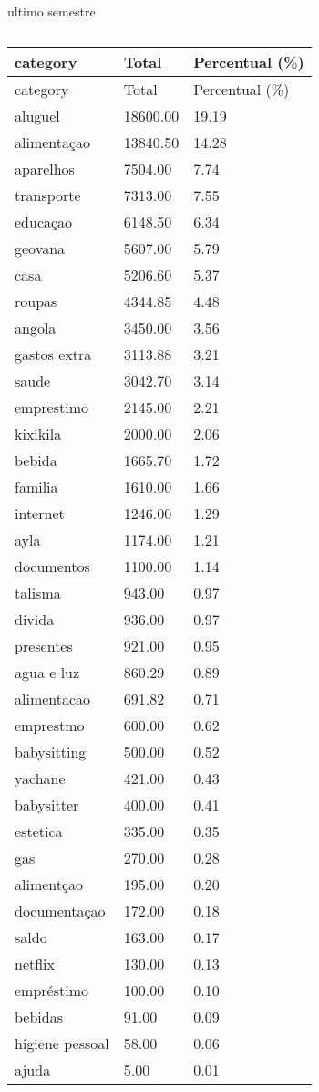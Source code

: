 \documentclass[
  8pt,
  a4paper,
  DIV=11,
  numbers=noendperiod]{scrartcl}
\begin{document}
\begin{figure}
\begin{minipage}{0.50\linewidth}
\end{minipage}%
%
\begin{minipage}{0.50\linewidth}
ultimo semestre

\begin{longtable}[]{@{}lll@{}}
\caption{}\label{T_4b45d}\tabularnewline
\toprule\noalign{}
category & Total & Percentual (\%) \\
\midrule\noalign{}
\endfirsthead
\toprule\noalign{}
category & Total & Percentual (\%) \\
\midrule\noalign{}
\endhead
\bottomrule\noalign{}
\endlastfoot
aluguel & 18600.00 & 19.19 \\
alimentaçao & 13840.50 & 14.28 \\
aparelhos & 7504.00 & 7.74 \\
transporte & 7313.00 & 7.55 \\
educaçao & 6148.50 & 6.34 \\
geovana & 5607.00 & 5.79 \\
casa & 5206.60 & 5.37 \\
roupas & 4344.85 & 4.48 \\
angola & 3450.00 & 3.56 \\
gastos extra & 3113.88 & 3.21 \\
saude & 3042.70 & 3.14 \\
emprestimo & 2145.00 & 2.21 \\
kixikila & 2000.00 & 2.06 \\
bebida & 1665.70 & 1.72 \\
familia & 1610.00 & 1.66 \\
internet & 1246.00 & 1.29 \\
ayla & 1174.00 & 1.21 \\
documentos & 1100.00 & 1.14 \\
talisma & 943.00 & 0.97 \\
divida & 936.00 & 0.97 \\
presentes & 921.00 & 0.95 \\
agua e luz & 860.29 & 0.89 \\
alimentacao & 691.82 & 0.71 \\
emprestmo & 600.00 & 0.62 \\
babysitting & 500.00 & 0.52 \\
yachane & 421.00 & 0.43 \\
babysitter & 400.00 & 0.41 \\
estetica & 335.00 & 0.35 \\
gas & 270.00 & 0.28 \\
alimentçao & 195.00 & 0.20 \\
documentaçao & 172.00 & 0.18 \\
saldo & 163.00 & 0.17 \\
netflix & 130.00 & 0.13 \\
empréstimo & 100.00 & 0.10 \\
bebidas & 91.00 & 0.09 \\
higiene pessoal & 58.00 & 0.06 \\
ajuda & 5.00 & 0.01 \\
\end{longtable}


\end{minipage}
\end{figure}
\end{document}
